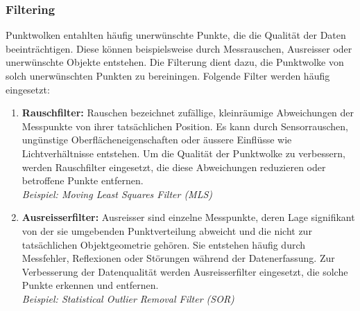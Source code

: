 \subsubsection{Filtering}
\begin{German}
    Punktwolken entahlten häufig unerwünschte Punkte, die die Qualität der Daten beeinträchtigen. Diese können beispielsweise durch Messrauschen, Ausreisser oder unerwünschte Objekte entstehen. Die Filterung dient dazu, die Punktwolke von solch unerwünschten Punkten zu bereiningen. Folgende Filter werden häufig eingesetzt:

    \begin{enumerate}
        \item \textbf{Rauschfilter:} Rauschen bezeichnet zufällige, kleinräumige Abweichungen der Messpunkte von ihrer tatsächlichen Position. Es kann durch Sensorrauschen, ungünstige Oberflächeneigenschaften oder äussere Einflüsse wie Lichtverhältnisse entstehen. Um die Qualität der Punktwolke zu verbessern, werden Rauschfilter eingesetzt, die diese Abweichungen reduzieren oder betroffene Punkte entfernen. \cite{liu3DPointCloud2021}\\
        \textit{Beispiel: Moving Least Squares Filter (MLS)}
        
        \item \textbf{Ausreisserfilter:} Ausreisser sind einzelne Messpunkte, deren Lage signifikant von der sie umgebenden Punktverteilung abweicht und die nicht zur tatsächlichen Objektgeometrie gehören. Sie entstehen häufig durch Messfehler, Reflexionen oder Störungen während der Datenerfassung. Zur Verbesserung der Datenqualität werden Ausreisserfilter eingesetzt, die solche Punkte erkennen und entfernen. \cite{liu3DPointCloud2021}\\
        \textit{Beispiel: Statistical Outlier Removal Filter (SOR)}
    \end{enumerate}
\end{German}

